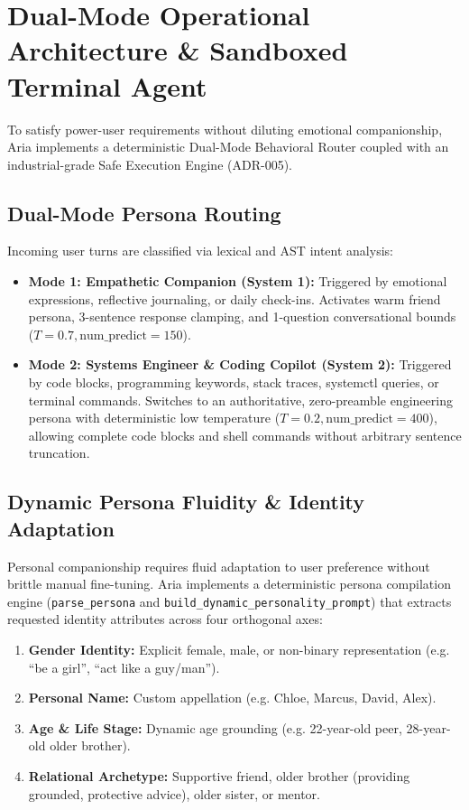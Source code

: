 \documentclass[10pt,a4paper]{article}
\begin{document}
\section{Dual-Mode Operational Architecture \& Sandboxed Terminal Agent}

To satisfy power-user requirements without diluting emotional companionship, Aria implements a deterministic Dual-Mode Behavioral Router coupled with an industrial-grade Safe Execution Engine (ADR-005).

\subsection{Dual-Mode Persona Routing}
Incoming user turns are classified via lexical and AST intent analysis:
\begin{itemize}
    \item \textbf{Mode 1: Empathetic Companion (System 1):} Triggered by emotional expressions, reflective journaling, or daily check-ins. Activates warm friend persona, 3-sentence response clamping, and 1-question conversational bounds ($T=0.7, \text{num\_predict}=150$).
    \item \textbf{Mode 2: Systems Engineer \& Coding Copilot (System 2):} Triggered by code blocks, programming keywords, stack traces, systemctl queries, or terminal commands. Switches to an authoritative, zero-preamble engineering persona with deterministic low temperature ($T=0.2, \text{num\_predict}=400$), allowing complete code blocks and shell commands without arbitrary sentence truncation.
\end{itemize}

\subsection{Dynamic Persona Fluidity \& Identity Adaptation}
Personal companionship requires fluid adaptation to user preference without brittle manual fine-tuning. Aria implements a deterministic persona compilation engine (\texttt{parse\_persona} and \texttt{build\_dynamic\_personality\_prompt}) that extracts requested identity attributes across four orthogonal axes:
\begin{enumerate}
    \item \textbf{Gender Identity:} Explicit female, male, or non-binary representation (e.g. ``be a girl'', ``act like a guy/man'').
    \item \textbf{Personal Name:} Custom appellation (e.g. Chloe, Marcus, David, Alex).
    \item \textbf{Age \& Life Stage:} Dynamic age grounding (e.g. 22-year-old peer, 28-year-old older brother).
    \item \textbf{Relational Archetype:} Supportive friend, older brother (providing grounded, protective advice), older sister, or mentor.
\end{enumerate}
\end{document}
